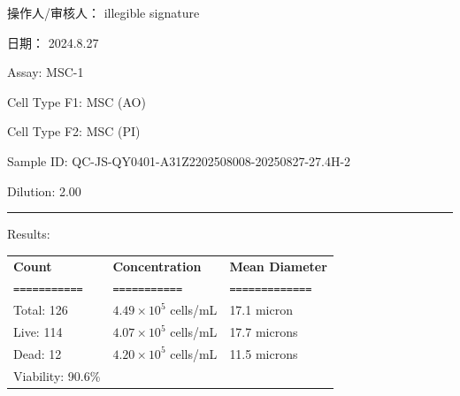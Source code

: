 \documentclass[UTF8,10pt,a4paper,fontset=fandol]{ctexart}
\newcommand{\fieldvalue}[1]{#1}
\newcommand{\handwritten}[1]{#1}
\begin{document}
\vspace{1em}

操作人/审核人：
\fieldvalue{\handwritten{illegible signature}}

\hfill 日期：
\fieldvalue{\handwritten{2024.8.27}}

\newpage

\noindent
Assay:
\fieldvalue{MSC-1}

\vspace{0.6em}

\noindent
Cell Type F1:
\fieldvalue{MSC (AO)}

\noindent
Cell Type F2:
\fieldvalue{MSC (PI)}

\vspace{0.6em}

\noindent
Sample ID:
\fieldvalue{QC-JS-QY0401-A31Z2202508008-20250827-27.4H-2}

\noindent
Dilution:
\fieldvalue{2.00}

\vspace{0.5em}
\noindent\rule{\textwidth}{0.4pt}

\noindent Results:

\vspace{0.4em}

\begin{tabularx}{\textwidth}{@{}X X X@{}}
\textbf{Count} & \textbf{Concentration} & \textbf{Mean Diameter} \\
\texttt{===========} & \texttt{===========} & \texttt{=============} \\[0.2em]
Total:
\fieldvalue{126}
&
\fieldvalue{$4.49\times10^{5}$ cells/mL}
&
\fieldvalue{17.1 micron}
\\
Live:
\fieldvalue{114}
&
\fieldvalue{$4.07\times10^{5}$ cells/mL}
&
\fieldvalue{17.7 microns}
\\
Dead:
\fieldvalue{12}
&
\fieldvalue{$4.20\times10^{5}$ cells/mL}
&
\fieldvalue{11.5 microns}
\\
Viability:
\fieldvalue{90.6\%}
&
&
\end{tabularx}
\end{document}

